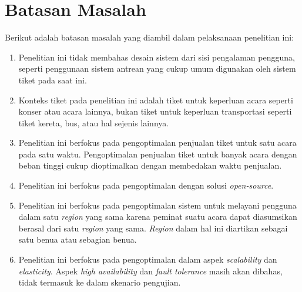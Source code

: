 \section{Batasan Masalah}
\label{sec:batasan-masalah}

Berikut adalah batasan masalah yang diambil dalam pelaksanaan penelitian ini:

\begin{enumerate}
  \item Penelitian ini tidak membahas desain sistem dari sisi pengalaman pengguna, seperti penggunaan sistem antrean yang cukup umum digunakan oleh sistem tiket pada saat ini.
  \item Konteks tiket pada penelitian ini adalah tiket untuk keperluan acara seperti konser atau acara lainnya, bukan tiket untuk keperluan transportasi seperti tiket kereta, bus, atau hal sejenis lainnya.
  \item Penelitian ini berfokus pada pengoptimalan penjualan tiket untuk satu acara pada satu waktu. Pengoptimalan penjualan tiket untuk banyak acara dengan beban tinggi cukup dioptimalkan dengan membedakan waktu penjualan.
  \item Penelitian ini berfokus pada pengoptimalan dengan solusi \textit{open-source}.
  \item Penelitian ini berfokus pada pengoptimalan sistem untuk melayani pengguna dalam satu \textit{region} yang sama karena peminat suatu acara dapat diasumsikan berasal dari satu \textit{region} yang sama. \textit{Region} dalam hal ini diartikan sebagai satu benua atau sebagian benua.
  \item Penelitian ini berfokus pada pengoptimalan dalam aspek \textit{scalability} dan \textit{elasticity}. Aspek \textit{high availability} dan \textit{fault tolerance} masih akan dibahas, tidak termasuk ke dalam skenario pengujian.
\end{enumerate}

